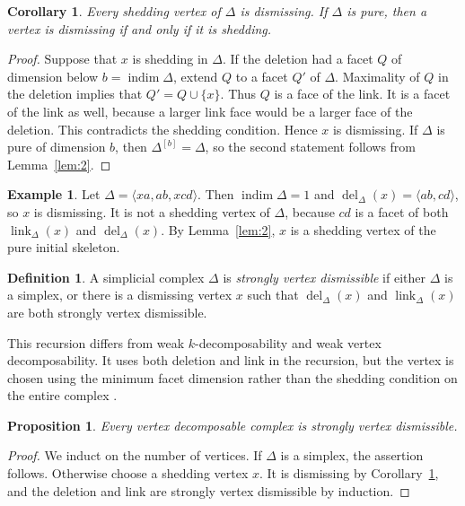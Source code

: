 \documentclass[11pt]{amsart}
\DeclareMathOperator{\indim}{indim}
\DeclareMathOperator{\link}{link}
\DeclareMathOperator{\del}{del}
\newtheorem{proposition}[theorem]{Proposition}
\newtheorem{corollary}[theorem]{Corollary}
\theoremstyle{definition}
\newtheorem{definition}[theorem]{Definition}
\newtheorem{example}[theorem]{Example}
\begin{document}
	\begin{corollary}\label{cor:1}
		Every shedding vertex of $\Delta$ is dismissing.  If $\Delta$ is pure, then a vertex is dismissing if and only if it is shedding.
	\end{corollary}
	
	\begin{proof}
		Suppose that $x$ is shedding in $\Delta$.  If the deletion had a facet $Q$ of dimension below $b=\indim\Delta$, extend $Q$ to a facet $Q'$ of $\Delta$.  Maximality of $Q$ in the deletion implies that $Q'=Q\cup\{x\}$.  Thus $Q$ is a face of the link.  It is a facet of the link as well, because a larger link face would be a larger face of the deletion.  This contradicts the shedding condition.  Hence $x$ is dismissing.  If $\Delta$ is pure of dimension $b$, then $\Delta^{[b]}=\Delta$, so the second statement follows from Lemma~\ref{lem:2}.
	\end{proof}
	
	\begin{example}\label{ex:1}
		Let $\Delta=\langle xa,ab,xcd\rangle$. Then $\indim\Delta=1$ and $\del_\Delta(x)=\langle ab,cd\rangle$, so $x$ is dismissing.  It is not a shedding vertex of $\Delta$, because $cd$ is a facet of both $\link_\Delta(x)$ and $\del_\Delta(x)$.  By Lemma~\ref{lem:2}, $x$ is a shedding vertex of the pure initial skeleton.
	\end{example}
	
	\begin{definition}\label{def:2}
		A simplicial complex $\Delta$ is \emph{strongly vertex dismissible} if either $\Delta$ is a simplex, or there is a dismissing vertex $x$ such that $\del_\Delta(x)$ and $\link_\Delta(x)$ are both strongly vertex dismissible.
	\end{definition}
	
	This recursion differs from weak $k$-decomposability and weak vertex decomposability. It uses both deletion and link in the recursion, but the vertex is chosen using the minimum facet dimension rather than the shedding condition on the entire complex \cite{NagelRomer2008,ProvanBillera1980}.
	
	\begin{proposition}\label{prop:1}
		Every vertex decomposable complex is strongly vertex dismissible.
	\end{proposition}
	
	\begin{proof}
		We induct on the number of vertices.  If $\Delta$ is a simplex, the assertion follows. Otherwise choose a shedding vertex $x$.  It is dismissing by Corollary~\ref{cor:1}, and the deletion and link are strongly vertex dismissible by induction.
	\end{proof}
	
\end{document}
